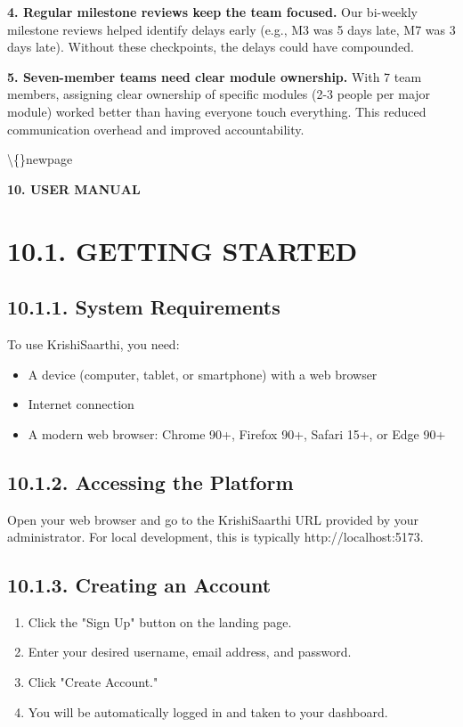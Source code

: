 \documentclass[12pt, a4paper]{report}
\begin{document}
\textbf{4. Regular milestone reviews keep the team focused.} Our bi-weekly milestone reviews helped identify delays early (e.g., M3 was 5 days late, M7 was 3 days late). Without these checkpoints, the delays could have compounded.

\textbf{5. Seven-member teams need clear module ownership.} With 7 team members, assigning clear ownership of specific modules (2-3 people per major module) worked better than having everyone touch everything. This reduced communication overhead and improved accountability.

\textbackslash\{\}newpage

\begin{center}
{\fontsize{14}{17}\bfseries 10. USER MANUAL}\\
\end{center}
\section{10.1. GETTING STARTED}
\subsection{10.1.1. System Requirements}
To use KrishiSaarthi, you need:

\begin{itemize}[leftmargin=*]
  \item A device (computer, tablet, or smartphone) with a web browser
  \item Internet connection
  \item A modern web browser: Chrome 90+, Firefox 90+, Safari 15+, or Edge 90+
\end{itemize}
\subsection{10.1.2. Accessing the Platform}
Open your web browser and go to the KrishiSaarthi URL provided by your administrator. For local development, this is typically http://localhost:5173.

\subsection{10.1.3. Creating an Account}
\begin{enumerate}[leftmargin=*]
  \item Click the "Sign Up" button on the landing page.
  \item Enter your desired username, email address, and password.
  \item Click "Create Account."
  \item You will be automatically logged in and taken to your dashboard.
\end{enumerate}
\end{document}
